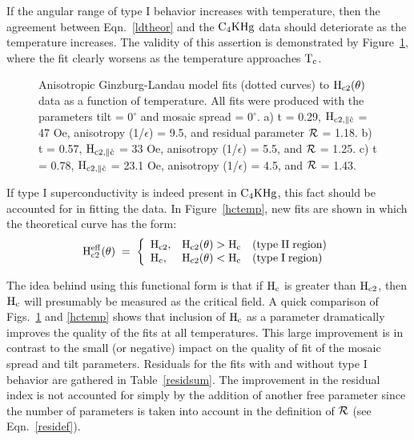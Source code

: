 	If the angular range of type I behavior increases with temperature,
then  the agreement between Eqn.~\ref{ldtheor}  and   the $\rm C_4KHg$ data
should deteriorate as the temperature  increases.  The validity of this  assertion
is demonstrated by Figure~\ref{thetatemp}, where the fit clearly worsens as
the temperature approaches $\rm T_c$.

\begin{figure}
\vspace{7.5in}
\caption[Anisotropic Ginzburg-Landau model fits   to $\rm
H_{c2}(\theta)$ data    for  a $\rm  C_4KHg$  sample   as  a    function of
temperature.]{Anisotropic  Ginzburg-Landau model fits  (dotted  curves)  to
$\rm H_{c2}(\theta)$ data  as a  function of  temperature.  All  fits  were
produced  with  the   parameters tilt   = 0$^{\circ}$  and  mosaic spread =
0$^{\circ}$.   a)  t   = 0.29, $\rm  H_{c2,\parallel\hat{c}}$   =   47  Oe,
anisotropy (1/$\epsilon$) =  9.5, and residual parameter $\cal   R$ = 1.18.
b) t = 0.57, $\rm H_{c2,
\parallel\hat{c}}$ = 33 Oe, anisotropy (1/$\epsilon$) = 5.5, and  $\cal R$ = 1.25.  c) t
= 0.78, $\rm H_{c2,\parallel\hat{c}}$ =  23.1 Oe, anisotropy (1/$\epsilon$)
= 4.5, and $\cal R$ = 1.43.}
\label{thetatemp}
\end{figure}

	If type I superconductivity is indeed present in $\rm C_4KHg$, this
fact should be accounted for in fitting the  data.  In Figure~\ref{hctemp},
new fits are shown in which the theoretical curve has the form:\\

\begin{equation}
\label{typeItheta}
\rm H_{c2}^{eff}(\theta) \; = \; \left\{ \begin{array}{lll}
				  \rm H_{c2}, & \rm H_{c2}(\theta) > H_c & {\rm
(type \;  II \; region)} \\ 
\rm H_c, & \rm H_{c2}(\theta) < H_c & {\rm (type \; I \; region)}
				  \end{array} \right.
\end{equation}

\noindent The idea behind using this functional form is that if $\rm  H_c$ is greater
than  $\rm  H_{c2}$,  then $\rm H_c$   will  presumably be measured  as the
critical field.  A quick comparison of Figs.~\ref{thetatemp} and
\ref{hctemp} shows that  inclusion of $\rm  H_c$  as a parameter dramatically
improves the  quality  of   the fits   at  all  temperatures.    This large
improvement is in contrast to the small (or  negative) impact on the quality of
fit of the mosaic spread and tilt parameters.  Residuals  for the fits with
and without type  I behavior are gathered  in   Table~\ref{residsum}.   The
improvement in the  residual index  is  not  accounted  for  simply by  the
addition of another free parameter since the number of  parameters is taken
into account in the definition of $\cal R$ (see Eqn.~\ref{residef}).

